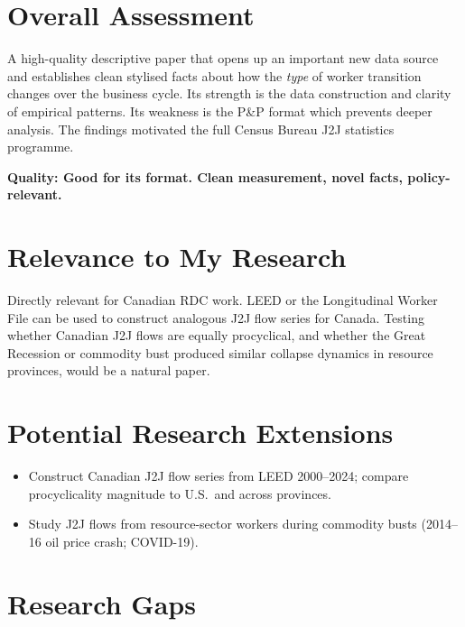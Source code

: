 \section{Overall Assessment}

A high-quality descriptive paper that opens up an important new data source
and establishes clean stylised facts about how the \emph{type} of worker
transition changes over the business cycle. Its strength is the data
construction and clarity of empirical patterns. Its weakness is the P\&P
format which prevents deeper analysis. The findings motivated the full Census
Bureau J2J statistics programme.

\textbf{Quality: Good for its format. Clean measurement, novel facts,
policy-relevant.}

\section{Relevance to My Research}

Directly relevant for Canadian RDC work. LEED or the Longitudinal Worker
File can be used to construct analogous J2J flow series for Canada. Testing
whether Canadian J2J flows are equally procyclical, and whether the Great
Recession or commodity bust produced similar collapse dynamics in resource
provinces, would be a natural paper.

\section{Potential Research Extensions}

\begin{itemize}
  \item Construct Canadian J2J flow series from LEED 2000--2024; compare
    procyclicality magnitude to U.S.\ and across provinces.
  \item Study J2J flows from resource-sector workers during commodity busts
    (2014--16 oil price crash; COVID-19).
\end{itemize}

\section{Research Gaps}

